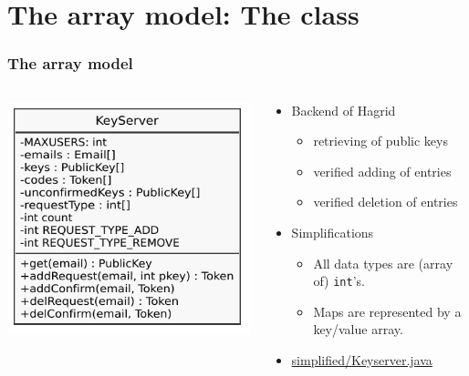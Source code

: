 \documentclass{beamer}
\begin{document}
\section{The array model: The class }
\begin{frame}
    \frametitle{The array model}
    \begin{columns}
    \begin{column}{.4\textwidth}
        \includegraphics[width=\textwidth]{simplified_uml.pdf}
    \end{column}
    \begin{column}{.6\textwidth}
        \begin{itemize}
            \item Backend of Hagrid
            \begin{itemize}
                \item retrieving of public keys
                \item verified adding of entries
                \item verified deletion of entries
            \end{itemize}
            \item Simplifications
            \begin{itemize}
                \item All data types are (array of) \texttt{int}'s.
                \item Maps are represented by a key/value array.
            \end{itemize}
            \item \href{https://github.com/KeYProject/verifythis-ltc-2020/blob/master/simplified/Keyserver.java}%
                        {simplified/Keyserver.java}
        \end{itemize}
    \end{column}
    \end{columns}
\end{frame}
\end{document}
